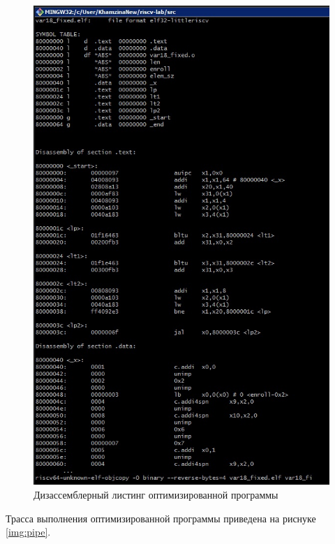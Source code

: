 \begin{figure}[H]
	\begin{center}
		\includegraphics[scale=0.4]{img/fixed-dis.jpg}
	\end{center}
	\captionsetup{justification=centering}
	\caption{Дизассемблерный листинг оптимизированной программы}
	\label{img:fixed-dis}
\end{figure}

Трасса выполнения оптимизированной программы приведена на риснуке \ref{img:pipe}.

